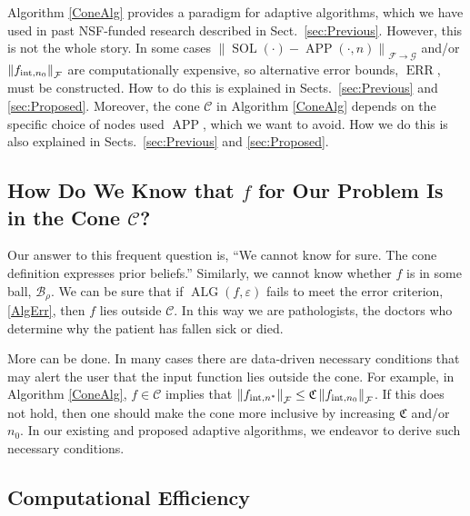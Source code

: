 \documentclass[11pt]{NSFamsart}
\DeclareMathOperator{\SOL}{SOL}
\DeclareMathOperator{\APP}{APP}
\DeclareMathOperator{\ALG}{ALG}
\DeclareMathOperator{\ERR}{ERR}
\newcommand{\cb}{\mathcal{B}}
\newcommand{\calc}{{\mathcal{C}}}
\newcommand{\calf}{{\mathcal{F}}}
\newcommand{\calg}{{\mathcal{G}}}
\newcommand{\fC}{\mathfrak{C}}
\newcommand{\norm}[2][{}]{\ensuremath{\left \lVert #2 \right \rVert}_{#1}}
\newcommand{\inflate}{\fC}
\begin{document}
Algorithm \ref{ConeAlg} provides a paradigm for adaptive algorithms, which we have used in past NSF-funded research described in Sect.\ \ref{sec:Previous}.  However, this is not the whole story. In some cases $\norm[\calf \to \calg]{\SOL(\cdot) - \APP(\cdot,n)}$ and/or $\norm[\calf]{f_{\textup{int},n_0}}$ are computationally expensive, so alternative error bounds, $\ERR$, must be constructed.  How to do this is explained in Sects.\ \ref{sec:Previous} and \ref{sec:Proposed}.  Moreover, the cone $\calc$ in Algorithm \ref{ConeAlg} depends on the specific choice of nodes used $\APP$, which we want to avoid.  How we do this is also explained in Sects.\ \ref{sec:Previous} and \ref{sec:Proposed}.

\subsection{How Do We Know that $f$ for Our Problem Is in the Cone $\calc$?} \label{sec:HowKnow}  

Our answer to this frequent question is, ``We cannot know for sure.  The cone definition expresses prior beliefs.''  Similarly, we cannot know whether $f$ is in some ball, $\cb_{\rho}$.  We can be sure that if $\ALG(f,\varepsilon)$ fails to meet the error criterion, \eqref{AlgErr}, then $f$ lies outside $\calc$.  In this way we are pathologists, the doctors who determine why the patient has fallen sick or died.

More can be done.  In many cases there are data-driven necessary conditions that may alert the user that the input function lies outside the cone.  For example, in Algorithm \ref{ConeAlg}, $f \in \calc$ implies that $\norm[\calf]{f_{\textup{int},n^*}} \le \inflate \norm[\calf]{f_{\textup{int},n_0}}$.  If this does not hold, then one should make the cone more inclusive by increasing $\inflate$ and/or $n_0$.  In our existing and proposed adaptive algorithms,  we endeavor to derive such necessary conditions.

\subsection{Computational Efficiency} \label{sec:CompEff}
\end{document}
